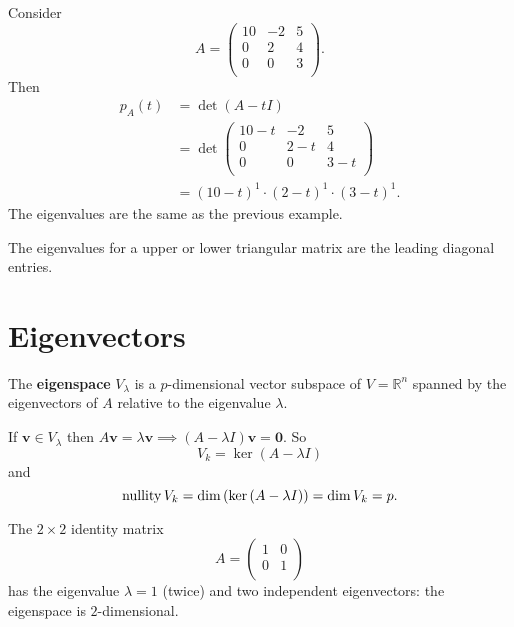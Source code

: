 \begin{example}
    Consider 
    \[
        A =
        \begin{pmatrix}
            10 & -2 & 5 \\
            0 & 2 & 4 \\
            0 & 0 & 3 \\
        \end{pmatrix}
        .
    \]
    Then
    \begin{align*}
        p_A(t) &= \det{(A - tI)} \\
        &= \det
        \begin{pmatrix}
            10 - t & -2 & 5 \\
            0 & 2 - t & 4 \\
            0 & 0 & 3 - t \\
        \end{pmatrix}
        \\
        &= (10 - t)^1 \cdot (2 - t)^1 \cdot (3 - t)^1.
    \end{align*}
    The eigenvalues are the same as the previous example.
\end{example}

\begin{remark}
    The eigenvalues for a upper or lower triangular matrix are the leading diagonal entries.
\end{remark}

\section{Eigenvectors}

\begin{definition}
    The \textbf{eigenspace} $V_\lambda$ is a $p$-dimensional vector subspace of $V = \mathbb{R}^n$ spanned by the eigenvectors of $A$ relative to the eigenvalue $\lambda$.
\end{definition}

\begin{remark}
    If $\bm{v} \in V_\lambda$ then $A \bm{v} = \lambda \bm{v} \implies (A - \lambda I) \bm{v} = \bm{0}$. So \[ V_k = \ker{(A - \lambda I)} \] and \[ \operatorname{nullity}{V_k} = \dim{(\ker{(A - \lambda I)})} = \dim{V_k} = p. \]
\end{remark}

\begin{example}
    The $2 \times 2$ identity matrix 
    \[
        A =
        \begin{pmatrix}
            1 & 0 \\
            0 & 1 \\
        \end{pmatrix}
    \]
    has the eigenvalue $\lambda = 1$ (twice) and two independent eigenvectors: the eigenspace is $2$-dimensional.
\end{example}

